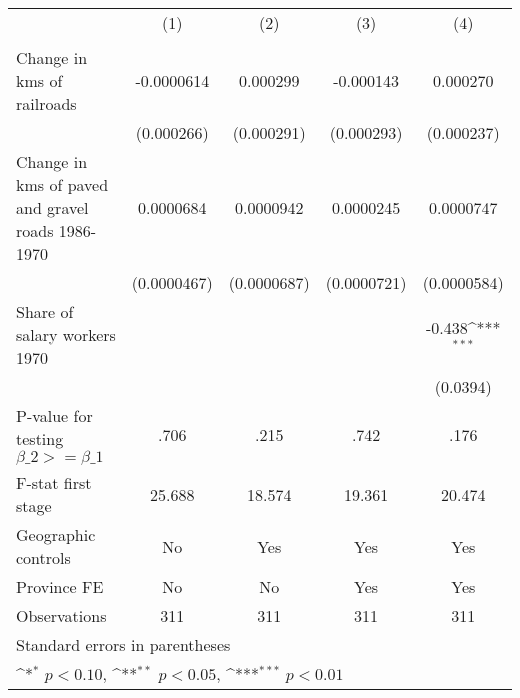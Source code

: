 {
\def\sym#1{\ifmmode^{#1}\else\(^{#1}\)\fi}
\begin{tabular}{l*{4}{c}}
\hline\hline
                &\multicolumn{1}{c}{(1)}&\multicolumn{1}{c}{(2)}&\multicolumn{1}{c}{(3)}&\multicolumn{1}{c}{(4)}\\
                &\multicolumn{1}{c}{}&\multicolumn{1}{c}{}&\multicolumn{1}{c}{}&\multicolumn{1}{c}{}\\
\hline
Change in kms of railroads&-0.0000614         & 0.000299         &-0.000143         & 0.000270         \\
                &(0.000266)         &(0.000291)         &(0.000293)         &(0.000237)         \\
[1em]
Change in kms of paved and gravel roads 1986-1970&0.0000684         &0.0000942         &0.0000245         &0.0000747         \\
                &(0.0000467)         &(0.0000687)         &(0.0000721)         &(0.0000584)         \\
[1em]
Share of salary workers 1970&                  &                  &                  &   -0.438\sym{***}\\
                &                  &                  &                  & (0.0394)         \\
\hline
P-value for testing $\beta\_{2} >= \beta\_{1}$&     .706         &     .215         &     .742         &     .176         \\
F-stat first stage&   25.688         &   18.574         &   19.361         &   20.474         \\
Geographic controls&       No         &      Yes         &      Yes         &      Yes         \\
Province FE     &       No         &       No         &      Yes         &      Yes         \\
Observations    &      311         &      311         &      311         &      311         \\
\hline\hline
\multicolumn{5}{l}{\footnotesize Standard errors in parentheses}\\
\multicolumn{5}{l}{\footnotesize \sym{*} \(p<0.10\), \sym{**} \(p<0.05\), \sym{***} \(p<0.01\)}\\
\end{tabular}
}
